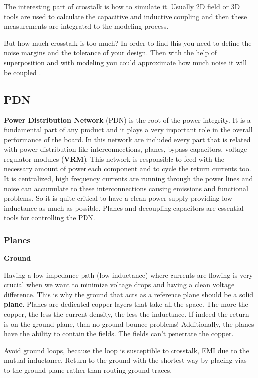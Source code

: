 \documentclass[final]{cubedoc}
\begin{document}
	The interesting part of crosstalk is how to simulate it. Usually 2D field or 3D tools are used to calculate the capacitive and inductive coupling and then these measurements are integrated to the modeling process. 
	
	But how much crosstalk is too much? In order to find this you need to define the noise margins and the tolerance of your design. Then with the help of superposition and with modeling you could approximate how much noise it will be coupled \cite{montrose2004emc,bogatin2009signal}.
	
	\subsection{PDN}
	
	\textbf{Power Distribution Network} (PDN) is the root of the power integrity. It is a fundamental part of any product and it plays a very important role in the overall performance of the board. In this network are included every part that is related with power distribution like interconnections, planes, bypass capacitors, voltage regulator modules (\textbf{VRM}). This network is responsible to feed with the necessary amount of power each component and to cycle the return currents too. It is centralized, high frequency currents are running through the power lines and noise can accumulate to these interconnections causing emissions and functional problems. So it is quite critical to have a clean power supply providing low inductance as much as possible. Planes and decoupling capacitors are essential tools for controlling the PDN.
	
	\subsubsection{Planes}
	
	\textbf{Ground}
	
	Having a low impedance path (low inductance) where currents are flowing is very crucial when we want to minimize voltage drops and having a clean voltage difference. This is why the ground that acts as a reference plane should be a solid \textbf{plane}. Planes are dedicated copper layers that take all the space. The more the copper, the less the current density, the less the inductance. If indeed the return is on the ground plane, then no ground bounce problems! Additionally, the planes have the ability to contain the fields. The fields can't penetrate the copper.
	
	Avoid ground loops, because the loop is susceptible to crosstalk, EMI due to the mutual inductance. Return to the ground with the shortest way by placing vias to the ground plane rather than routing ground traces.
	
\end{document}
